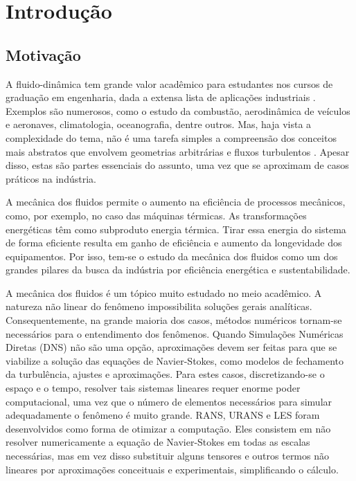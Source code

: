 \chapter[Introdução]{Introdução}
\label{sec:introduction}

\section{Motivação}
A fluido-dinâmica tem grande valor acadêmico para estudantes nos cursos de graduação em engenharia, dada a extensa lista de aplicações industriais \cite{CFD_in_learing_2}. Exemplos são numerosos, como o estudo da combustão, aerodinâmica de veículos e aeronaves, climatologia, oceanografia, dentre outros.
Mas, haja vista a complexidade do tema, não é uma tarefa simples a compreensão dos conceitos mais abstratos que envolvem geometrias arbitrárias e fluxos turbulentos \cite{hasan}. Apesar disso, estas são partes essenciais do assunto, uma vez que se aproximam de casos práticos na indústria.

A mecânica dos fluidos permite o aumento na eficiência de processos mecânicos, como, por exemplo, no caso das máquinas térmicas. As transformações energéticas têm como subproduto energia térmica. Tirar essa energia do sistema de forma eficiente resulta em ganho de eficiência e aumento da longevidade dos equipamentos. Por isso, tem-se o estudo da mecânica dos fluidos como um dos grandes pilares da busca da indústria por eficiência energética e sustentabilidade.

A mecânica dos fluidos é um tópico muito estudado no meio acadêmico. A natureza não linear do fenômeno \cite{John} impossibilita soluções gerais analíticas. Consequentemente, na grande maioria dos casos, métodos numéricos tornam-se necessários para o entendimento dos fenômenos. Quando Simulações Numéricas Diretas (DNS) não são uma opção, aproximações devem ser feitas para que se viabilize a solução das equações de Navier-Stokes, como modelos de fechamento da turbulência, ajustes e aproximações. Para estes casos, discretizando-se o espaço e o tempo, resolver tais sistemas lineares requer enorme poder computacional, uma vez que o número de elementos necessários para simular adequadamente o fenômeno é muito grande. RANS, URANS e LES foram desenvolvidos como forma de otimizar a computação. Eles consistem em não resolver numericamente a equação de Navier-Stokes em todas as escalas necessárias, mas em vez disso substituir alguns tensores e outros termos não lineares por aproximações conceituais e experimentais, simplificando o cálculo.

